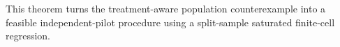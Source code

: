 This theorem turns the treatment-aware population counterexample into a feasible independent-pilot procedure using a split-sample saturated finite-cell regression.